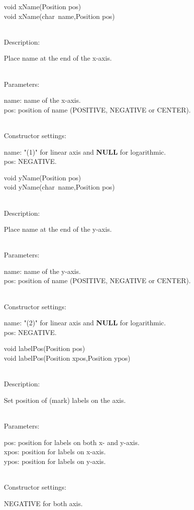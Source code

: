 \documentclass[12pt,a4paper]{article}
\newcommand{\memberitem}[1]{
                              \vspace{-0.5pc}
                              \end{minipage}\\
                              \phantom{M}#1:\\
                              \phantom{MM}
                              \begin{minipage}[t]{12cm}

                           }
\newcommand{\memdsc}{\memberitem{Description}}
\newcommand{\meminp}{\memberitem{Parameters}}
\newcommand{\memdef}{\memberitem{Constructor settings}}
\newenvironment{MemberDescr}
  {
    \begin{minipage}{15cm}
    \bf
  }
  {
    \end{minipage}
  }
\newcommand{\pntr}{\raisebox{-0.25em}{*}\ }
\begin{document}
  \begin{MemberDescr}
     void xName(Position pos)\\
     void xName(char\pntr name,Position pos)\\
    \memdsc
      Place name at the end of the x-axis.\\
    \meminp
      name: name of the x-axis.\\
      pos:  position of name (POSITIVE, NEGATIVE or CENTER).\\
    \memdef
      name: "(1)" for linear axis and \textbf{NULL} for logarithmic.\\
      pos:  NEGATIVE.\\
  \end{MemberDescr}

  \begin{MemberDescr}
     void yName(Position pos)\\
     void yName(char\pntr name,Position pos)\\
    \memdsc
      Place name at the end of the y-axis.\\
    \meminp
      name: name of the y-axis.\\
      pos:  position of name (POSITIVE, NEGATIVE or CENTER).\\
    \memdef
      name: "(2)" for linear axis and \textbf{NULL} for logarithmic.\\
      pos:  NEGATIVE.\\
  \end{MemberDescr}

  \begin{MemberDescr}
     void labelPos(Position pos)\\
     void labelPos(Position xpos,Position ypos)\\
    \memdsc
      Set position of (mark) labels on the axis.\\
    \meminp
      pos:  position for labels on both x- and y-axis.\\
      xpos: position for labels on x-axis.\\
      ypos: position for labels on y-axis.\\
    \memdef
      NEGATIVE for both axis.\\
  \end{MemberDescr}
\end{document}
